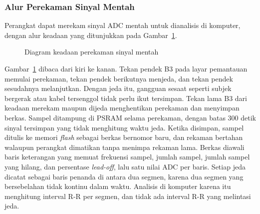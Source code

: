 \subsubsection{Alur Perekaman Sinyal Mentah}

Perangkat dapat merekam sinyal ADC mentah untuk dianalisis di komputer, dengan alur keadaan yang ditunjukkan pada Gambar~\ref{fig:3-alur-rekam}.

\begin{figure}[!ht]
  \centering
  \caption{Diagram keadaan perekaman sinyal mentah}
  \label{fig:3-alur-rekam}
\end{figure}

Gambar~\ref{fig:3-alur-rekam} dibaca dari kiri ke kanan. Tekan pendek B3 pada layar pemantauan memulai perekaman, tekan pendek berikutnya menjeda, dan tekan pendek sesudahnya melanjutkan. Dengan jeda itu, gangguan sesaat seperti subjek bergerak atau kabel tersenggol tidak perlu ikut tersimpan. Tekan lama B3 dari keadaan merekam maupun dijeda menghentikan perekaman dan menyimpan berkas. Sampel ditampung di PSRAM selama perekaman, dengan batas 300 detik sinyal tersimpan yang tidak menghitung waktu jeda. Ketika disimpan, sampel ditulis ke memori \textit{flash} sebagai berkas bernomor baru, dan rekaman bertahan walaupun perangkat dimatikan tanpa menimpa rekaman lama. Berkas diawali baris keterangan yang memuat frekuensi sampel, jumlah sampel, jumlah sampel yang hilang, dan persentase \textit{lead-off}, lalu satu nilai ADC per baris. Setiap jeda dicatat sebagai baris penanda di antara dua segmen, karena dua segmen yang bersebelahan tidak kontinu dalam waktu. Analisis di komputer karena itu menghitung interval R-R per segmen, dan tidak ada interval R-R yang melintasi jeda.

